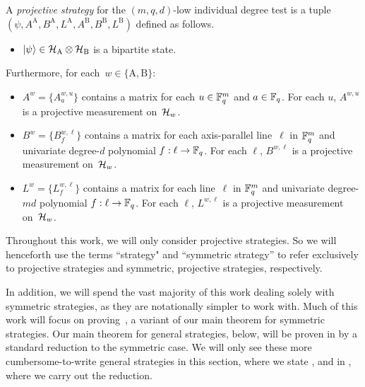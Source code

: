 \begin{definition}
A \emph{projective strategy} for the $(m,q, d)$-low individual degree test
is a tuple $(\psi, A^{\mathrm{A}},B^{\mathrm{A}},L^{\mathrm{A}},A^{\mathrm{B}},B^{\mathrm{B}},L^{\mathrm{B}})$ defined as follows.
\begin{itemize}
\item[$\circ$] $\ket{\psi} \in \mathcal{H}_{\mathrm{A}} \otimes \mathcal{H}_{\mathrm{B}}$ is a bipartite state.
\end{itemize}
Furthermore, for each~$w \in \{\mathrm{A}, \mathrm{B}\}$:
\begin{itemize}
\item[$\circ$] $A^{w} = \{A^{w,u}_a\}$ contains a matrix for each $u \in \mathbb F_q^m$ and $a \in \mathbb F_q$.
			For each $u$, $A^{w,u}$ is a projective measurement on~$\mathcal{H}_{w}$.
\item[$\circ$] $B^{w} = \{B^{w,\ell}_f\}$ contains a matrix for each axis-parallel line~$\ell$ in $\mathbb F_q^m$
			and univariate degree-$d$ polynomial $f:\ell\rightarrow \mathbb F_q$.
			For each $\ell$, $B^{w,\ell}$ is a projective measurement on~$\mathcal{H}_{w}$.
\item[$\circ$] $L^w = \{L^{w,\ell}_f\}$ contains a matrix for each line~$\ell$ in $\mathbb F_q^m$
			and univariate degree-$md$ polynomial $f:\ell\rightarrow \mathbb F_q$.
			For each $\ell$, $L^{w,\ell}$ is a projective measurement on~$\mathcal{H}_{w}$.
\end{itemize}
\end{definition}

\begin{remark}
Throughout this work, we will only consider projective strategies.
So we will henceforth use the terms ``strategy" and ``symmetric strategy'' to refer exclusively to projective strategies and symmetric, projective strategies, respectively.

In addition, we will spend the vast majority of this work dealing solely with symmetric strategies, as they are notationally simpler to work with.
Much of this work will focus on proving~,
a variant of our main theorem for symmetric strategies.
Our main theorem for general strategies,  below, will be proven in  by a standard reduction to the symmetric case.
We will only see these more cumbersome-to-write general strategies
in this section, where we state ,
and in , where we carry out the reduction.
\end{remark}

